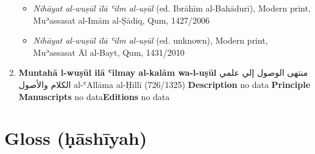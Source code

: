 \documentclass{article}
\begin{document}
\begin{enumerate}
\begin{itemize}
        \item \emph{Nihāyat al-wuṣūl ilā ʿilm al-uṣūl} (ed. Ibrāhīm al-Bahādurī), Modern print, Muʾassasat al-Imām al-Ṣādiq, Qum, 1427/2006
        
        \item \emph{Nihāyat al-wuṣūl ilā ʿilm al-uṣūl} (ed. unknown), Modern print, Muʾassasat Āl al-Bayt, Qum, 1431/2010
        \end{itemize}

      \item \textbf{Muntahā l-wuṣūl ilā ʿilmay al-kalām wa-l-uṣūl}
        \newline
        \textarabic{منتهى الوصول إلي علمي الكلام والأصول}
        \newline
        al-ʿAllāma al-Ḥillī
        \newline
        (726/1325)
        \newline
        \newline
        \textbf{Description}
        \newline	
        no data
        \newline
        \newline
    \textbf{Principle Manuscripts}
\newline
no data\newline\textbf{Editions}
\newline
no data\newline\end{enumerate}\section{Gloss (ḥāshīyah)}
\end{document}
